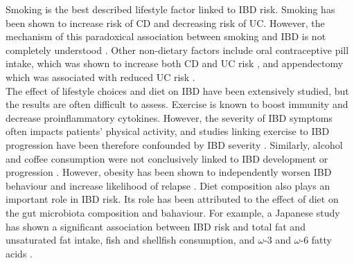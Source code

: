 Smoking is the best described lifestyle factor linked to IBD risk. Smoking has been shown to increase risk of CD and decreasing risk of UC. However, the mechanism of this paradoxical association between smoking and IBD is not completely understood \cite{Richardson2003-pd}.  Other non-dietary factors include oral contraceptive pill intake, which was shown to increase both CD and UC risk \cite{Cornish2008-rn}, and appendectomy which was associated with reduced UC risk \cite{Koutroubakis2000-qt}.\\

The effect of lifestyle choices and diet on IBD have been extensively studied, but the results are often difficult to assess. Exercise is known to boost immunity and decrease proinflammatory cytokines. However, the severity of IBD symptoms often impacts patients' physical activity, and studies linking exercise to IBD progression have been therefore confounded by IBD severity \cite{Rozich2020-ui}. Similarly, alcohol and coffee consumption were not conclusively linked to IBD development or progression \cite{Yang2019-gt}. However, obesity has been shown to independently worsen IBD behaviour and increase likelihood of relapse \cite{Jain2019-oy}. Diet composition also plays an important role in IBD risk. Its role has been attributed to the effect of diet on the gut microbiota composition and bahaviour. For example, a Japanese study has shown a significant association between IBD risk and total fat and unsaturated fat intake, fish and shellfish consumption, and $\omega$-3 and $\omega$-6 fatty acids \cite{Reif1997-li}.\\



